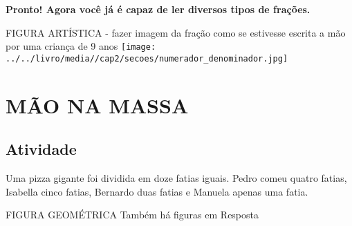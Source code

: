 \documentclass[a4,12pt]{book}
\begin{document}
{\bf Pronto! Agora você já é capaz de ler diversos tipos de frações.}





\begin{imagem*}[breakable]{}{}   FIGURA ARTÍSTICA - fazer imagem da fração como se estivesse escrita a mão por uma criança de 9 anos   \mbox{} \newline        \texttt{[image: ../../livro/media//cap2/secoes/numerador\_denominador.jpg]}   \end{imagem*}


\section*{MÃO NA MASSA }



\subsection{Atividade}








Uma pizza gigante foi dividida em doze fatias iguais. 
Pedro comeu quatro fatias, Isabella cinco fatias, Bernardo duas fatias e Manuela apenas uma fatia.
\begin{imagem*}[breakable]{}{}   FIGURA GEOMÉTRICA  Também há figuras em Resposta  
\end{imagem*}
\end{document}
